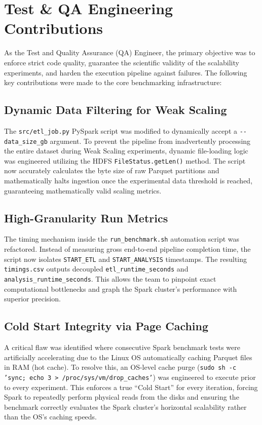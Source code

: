 \section{Test \& QA Engineering Contributions}
\label{sec:qa_contributions}

As the Test and Quality Assurance (QA) Engineer, the primary objective was to enforce strict code quality, guarantee the scientific validity of the scalability experiments, and harden the execution pipeline against failures. The following key contributions were made to the core benchmarking infrastructure:

\subsection{Dynamic Data Filtering for Weak Scaling}
The \texttt{src/etl\_job.py} PySpark script was modified to dynamically accept a \texttt{-{}-data\_size\_gb} argument. To prevent the pipeline from inadvertently processing the entire dataset during Weak Scaling experiments, dynamic file-loading logic was engineered utilizing the HDFS \texttt{FileStatus.getLen()} method. The script now accurately calculates the byte size of raw Parquet partitions and mathematically halts ingestion once the experimental data threshold is reached, guaranteeing mathematically valid scaling metrics.

\subsection{High-Granularity Run Metrics}
The timing mechanism inside the \texttt{run\_benchmark.sh} automation script was refactored. Instead of measuring gross end-to-end pipeline completion time, the script now isolates \texttt{START\_ETL} and \texttt{START\_ANALYSIS} timestamps. The resulting \texttt{timings.csv} outputs decoupled \texttt{etl\_runtime\_seconds} and \texttt{analysis\_runtime\_seconds}. This allows the team to pinpoint exact computational bottlenecks and graph the Spark cluster's performance with superior precision.

\subsection{Cold Start Integrity via Page Caching}
A critical flaw was identified where consecutive Spark benchmark tests were artificially accelerating due to the Linux OS automatically caching Parquet files in RAM (hot cache). To resolve this, an OS-level cache purge (\texttt{sudo sh -c 'sync; echo 3 > /proc/sys/vm/drop\_caches'}) was engineered to execute prior to every experiment. This enforces a true ``Cold Start'' for every iteration, forcing Spark to repeatedly perform physical reads from the disks and ensuring the benchmark correctly evaluates the Spark cluster's horizontal scalability rather than the OS's caching speeds.

